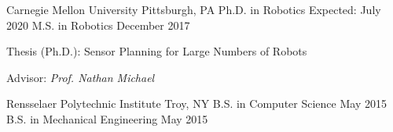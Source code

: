 
\begin{cventries}
  \cventrytwo
  {Carnegie Mellon University}
  {Pittsburgh, PA}
  {Ph.D. in Robotics}
  {Expected: July 2020}
  {}
  {M.S. in Robotics}
  {December 2017}
  {
    \begin{cvitems} %
    \item {Thesis (Ph.D.): Sensor Planning for Large Numbers of Robots}
    \item {Advisor: \emph{Prof. Nathan Michael}}
    \end{cvitems}
  }

  \cventrytwo
  {Rensselaer Polytechnic Institute} %
  {Troy, NY} %
  {B.S. in Computer Science} %
  {May 2015} %
  {}
  {B.S. in Mechanical Engineering} %
  {May 2015} %
  {}
\end{cventries}

